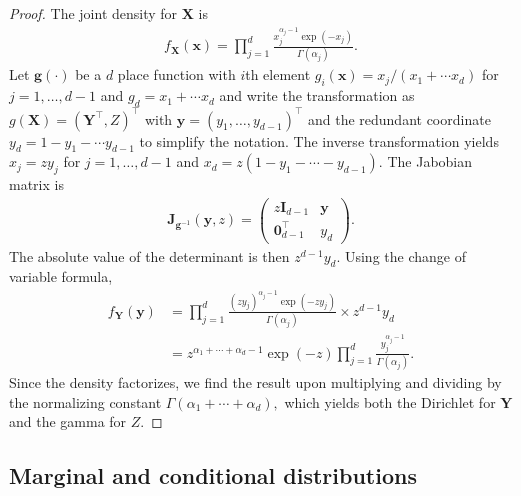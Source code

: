 \documentclass[
  11pt,
  letterpaper,
]{scrbook}
\theoremstyle{definition}
\theoremstyle{plain}
\theoremstyle{plain}
\theoremstyle{definition}
\theoremstyle{definition}
\theoremstyle{remark}
\begin{document}
\begin{proof}
The joint density for \(\boldsymbol{X}\) is \begin{align*}
f_{\boldsymbol{X}}(\boldsymbol{x}) = \prod_{j=1}^d  \frac{x_j^{\alpha_j-1}\exp(-x_j)}{\Gamma(\alpha_j)}.
\end{align*} Let \(\boldsymbol{g}(\cdot)\) be a \(d\) place function
with \(i\)th element \(g_i(\boldsymbol{x}) = x_j/(x_1 + \cdots x_d)\)
for \(j=1, \ldots, d-1\) and \(g_d=x_1 + \cdots x_d\) and write the
transformation as \(g(\boldsymbol{X}) = (\boldsymbol{Y}^\top, Z)^\top\)
with \(\boldsymbol{y} = (y_1, \ldots, y_{d-1})^\top\) and the redundant
coordinate \(y_d = 1- y_1 - \cdots y_{d-1}\) to simplify the notation.
The inverse transformation yields \(x_j = zy_j\) for
\(j=1, \ldots, d-1\) and \(x_d = z(1-y_1-\cdots - y_{d-1}).\) The
Jabobian matrix is \begin{align*}
\mathbf{J}_{\boldsymbol{g}^{-1}}(\boldsymbol{y}, z) = \begin{pmatrix} z \mathbf{I}_{d-1} & \boldsymbol{y} \\ \boldsymbol{0}^\top_{d-1} & y_d
\end{pmatrix}.
\end{align*} The absolute value of the determinant is then
\(z^{d-1}y_d.\) Using the change of variable formula, \begin{align*}
f_{\boldsymbol{Y}}(\boldsymbol{y}) &= \prod_{j=1}^{d}  \frac{(zy_j)^{\alpha_j-1}\exp(-zy_j)}{\Gamma(\alpha_j)} \times z^{d-1}y_d
\\&= z^{\alpha_1 + \cdots + \alpha_d - 1}\exp(-z) \prod_{j=1}^d \frac{y_j^{\alpha_j-1}}{\Gamma(\alpha_j)}.
\end{align*} Since the density factorizes, we find the result upon
multiplying and dividing by the normalizing constant
\(\Gamma(\alpha_1 + \cdots + \alpha_d),\) which yields both the
Dirichlet for \(\boldsymbol{Y}\) and the gamma for \(Z.\)
\end{proof}

\subsection{Marginal and conditional
distributions}\label{marginal-and-conditional-distributions}
\end{document}
